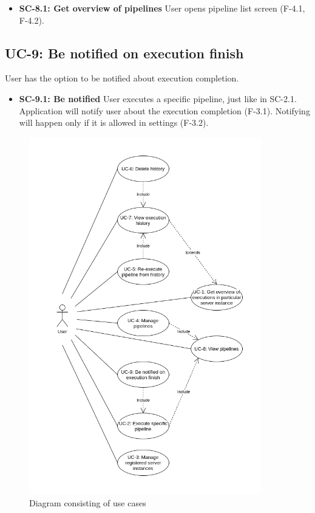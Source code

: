 \begin{itemize}
\item \textbf{SC-8.1: Get overview of pipelines}
User opens pipeline list screen (F-4.1, F-4.2).

\end{itemize}

\subsection*{UC-9: Be notified on execution finish}
User has the option to be notified about execution completion.

\begin{itemize}
\item \textbf{SC-9.1: Be notified}
User executes a specific pipeline, just like in SC-2.1. Application will notify user about the execution completion (F-3.1). Notifying will happen only if it is allowed in settings (F-3.2).

\end{itemize}

\begin{figure}\centering
	\includegraphics[width=0.9\textwidth]{pics/bc-uc.png}
	\caption[Use cases]{Diagram consisting of use cases}\label{fig:uc}
\end{figure}